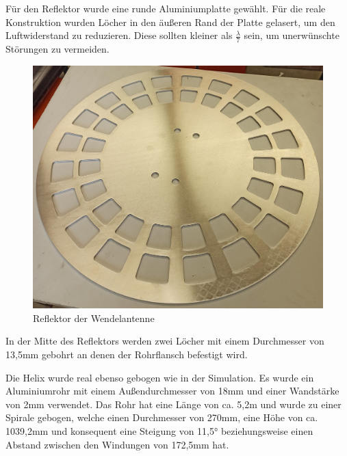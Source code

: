 Für den Reflektor wurde eine runde Aluminiumplatte gewählt. Für die reale Konstruktion wurden Löcher in den äußeren Rand der Platte gelasert, um den Luftwiderstand zu reduzieren. Diese sollten kleiner als $\frac{\lambda}{7}$ sein, um unerwünschte Störungen zu vermeiden.

\begin{figure}[h!]
	\centering
	\includegraphics[width=\textwidth]{../ref/Reflektor.jpg}
	\caption{Reflektor der Wendelantenne}
	\label{fig:Reflektor}
\end{figure}

In der Mitte des Reflektors werden zwei Löcher mit einem Durchmesser von 13,5mm gebohrt an denen der Rohrflansch befestigt wird. 

Die Helix wurde real ebenso gebogen wie in der Simulation. Es wurde ein Aluminiumrohr mit einem Außendurchmesser von 18mm und einer Wandstärke von 2mm verwendet. Das Rohr hat eine Länge von ca. 5,2m und wurde zu einer Spirale gebogen, welche einen Durchmesser von 270mm, eine Höhe von ca. 1039,2mm und konsequent eine Steigung von 11,5° beziehungsweise einen Abstand zwischen den Windungen von 172,5mm hat.

